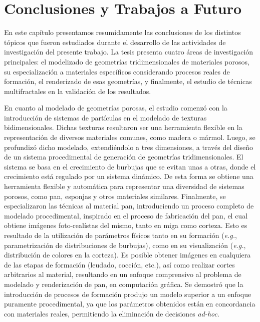 \chapter{Conclusiones y Trabajos a Futuro}
En este capítulo presentamos resumidamente las conclusiones de los distintos tópicos que fueron estudiados durante el desarrollo de las actividades de investigación del presente trabajo.
La tesis presenta cuatro áreas de investigación principales: el modelizado de geometrías tridimensionales de materiales porosos, su especialización a materiales específicos considerando procesos reales de formación, el renderizado de esas geometrías, y finalmente, el estudio de técnicas multifractales en la validación de los resultados.

En cuanto al modelado de geometrías porosas, el estudio comenzó con la introducción de sistemas de partículas en el modelado de texturas bidimensionales.
Dichas texturas resultaron ser una herramienta flexible en la representación de diversos materiales comunes, como madera o mármol.
Luego, se profundizó dicho modelado, extendiéndolo a tres dimensiones, a través del diseño de un sistema procedimental de generación de geometrías tridimensionales.
El sistema se basa en el crecimiento de burbujas que se evitan unas a otras, donde el crecimiento está regulado por un sistema dinámico.
De esta forma se obtiene una herramienta flexible y automática para representar una diversidad de sistemas porosos, como pan, esponjas y otros materiales similares.
Finalmente, se especializaron las técnicas al material pan, introduciendo un proceso completo de modelado procedimental, inspirado en el proceso de fabricación del pan, el cual obtiene imágenes foto-realístas del mismo, tanto en miga como corteza.
Esto es resultado de la utilización de parámetros físicos tanto en su formación ({\em e.g.}, parametrización de distribuciones de burbujas), como en su visualización ({\em e.g.}, distribución de colores en la corteza).
Es posible obtener imágenes en cualquiera de las etapas de formación (leudado, cocción, etc.), así como realizar cortes arbitrarios al material, resultando en un enfoque comprensivo al problema de modelado y renderización de pan, en computación gráfica.
Se demostró que la introducción de procesos de formación produjo un modelo superior a un enfoque puramente procedimental, ya que los parámetros obtenidos están en concordancia con materiales reales, permitiendo la eliminación de decisiones {\em ad-hoc}.

